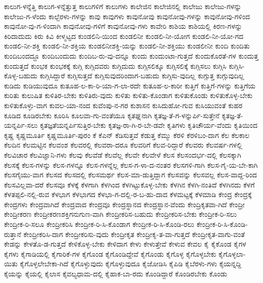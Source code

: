 {ಕಾಲುಗ-ಳನ್ನೆತ್ತಿ
ಕಾಲುಗ-ಳನ್ನೆತ್ತುತ್ತ
ಕಾಲುಗಳಿಗೆ
ಕಾಲುಗಳು
ಕಾಲೇಜಿನ
ಕಾಲೇಜಿನಲ್ಲಿ
ಕಾಲೇಜು
ಕಾಲೇಜು-ಗಳನ್ನು
ಕಾಲೇಜು-ಗ-ಳೆಂದು
ಕಾಲ್ಬೆರಳು-ಗಳನ್ನು
ಕಾವು
ಕಾವುಗಳು
ಕಾವುನೋವು
ಕಾವುನೋವು-ಗಳನ್ನು
ಕಾವುನೋವು-ಗಳಿಂದ
ಕಾವುನೋ-ವು-ಗ-ಳಿಂದಾಗಿ
ಕಾವುನೋವು-ಗಳಿಗೆ
ಕಾವುನೋವು-ಗಳು
ಕಾವೇರಿ
ಕಾಶಿಯ
ಕಾಶಿಯಲ್ಲಿ
ಕಿರಣ-ಗಳನ್ನು
ಕಿರಿದಾದುದು
ಕಿರು
ಕಿವಿ
ಕೀಳ್ಮಟ್ಟದ
ಕುಂಡಲಿನಿ-ಯಿಂದ
ಕುಂಡಲಿನೀ
ಕುಂಡಲಿ-ನೀ-ಯೋಗ
ಕುಂಡಲಿ-ನೀ-ಯೋ-ಗದ
ಕುಂಡಲಿ-ನೀ-ಶಕ್ತಿ
ಕುಂಡಲಿ-ನೀ-ಶಕ್ತಿಯ
ಕುಂಡಲಿನೀಶಕ್ತಿ-ಯನ್ನು
ಕುಂಡಲಿ-ನೀ-ಶಕ್ತಿಯು
ಕುಂಡಲೀನೀ
ಕುಂದಿ
ಕುಂದಿತು
ಕುಂದಿಬಂದದ್ದೂ
ಕುಂದಿಬಂದುದು
ಕುಂದಿಬ-ರು-ವು-ದನ್ನೂ
ಕುಂದು
ಕುಂದುಂಟಾ-ಗುತ್ತದೆ
ಕುಂದುಕೊರತೆ-ಗಳ
ಕುಂದುತ್ತ
ಕುಂದುತ್ತದೆ
ಕುಂಭಕ
ಕುಂಭಕಕ್ಕೆ
ಕುಗ್ಗಿ
ಕುಗ್ಗಿದವರು
ಕುಗ್ಗಿದುದು
ಕುಗ್ಗಿಸಲಿಕ್ಕೂ
ಕುಗ್ಗಿಸಲಿಕ್ಕೆ
ಕುಗ್ಗಿಸಲು
ಕುಗ್ಗಿಸಿ
ಕುಗ್ಗಿಸಿ-ಕೊಳ್ಳ-ಬಹುದು
ಕುಗ್ಗಿಸಿದ್ದಾರೆ
ಕುಗ್ಗಿಸುತ್ತದೆ
ಕುಗ್ಗಿಸುವುದರಿಂದಾಗ-ಬಹುದು
ಕುಗ್ಗಿಸು-ವುದಿಲ್ಲ
ಕುಗ್ಗುತ್ತ
ಕುಗ್ಗುವುದಿಲ್ಲ
ಕುಡಿದು
ಕುಡಿಯುವುದೂ
ಕುತೂಹ-ಲ-ಕಾ-ರಿ-ಯಾ-ಗ-ಲಾ-ರದೇ
ಕುತೂಹ-ಲ-ಕಾರೀ
ಕುತ್ತಿಗೆ
ಕುತ್ತಿಗೆ-ಗಳನ್ನು
ಕುತ್ತಿಗೆಯ
ಕುರಿತು
ಕುಲುಷಿತ
ಕುಳಿತಿರ-ಬೇಕು
ಕುಳಿತಿರು-ವುದು
ಕುಳಿತು
ಕುಳಿತು-ಕೊಂಡಾಗ
ಕುಳಿತುಕೊಂಡು
ಕುಳಿತುಕೊಳ್ಳ-ಬೇಕು
ಕುಳಿತುಕೊಳ್ಳು-ವಾಗ
ಕುವಲ-ಯಾ-ನಂದ
ಕುವೆಂಪು-ನ-ಗರ
ಕುಶಾಸನ
ಕುಸಿದುಹೋ-ಗುವ
ಕುಸಿಯುವಂತೆ
ಕುಹರ
ಕೂಡಿದ
ಕೂಡಿರಬೇಕು
ಕೂರಿಸಿ
ಕೂಲವಾ-ಗು-ವಂತೆಯೂ
ಕೃತಘ್ನನಾಗಿ
ಕೃತಜ್ಞ-ತೆ-ಗ-ಳನ್ನುರ್ಪಿ-ಸುತ್ತೇನೆ
ಕೃತಜ್ಞ-ತೆ-ಯನ್ನರ್ಪಿ-ಸಲು
ಕೃತಜ್ಞತೆಯನ್ನರ್ಪಿಸುತ್ತಿರ-ಬೇಕು
ಕೃತಜ್ಞ-ರಾ-ಗಿ-ರ-ಬೇ-ಡವೇ
ಕೃತಿಗಳು
ಕೃತಿಚೌರ್ಯ-ವೆಂದು
ಕೃತಿಯಿಂದ
ಕೃಷ್ಣ
ಕೃಷ್ಣಮೂರ್ತಿ
ಕೃಷ್ಣಮೂರ್ತಿ-ಪುರಂ
ಕೆ
ಕೆಎನ್
ಕೆಡಿಸುತ್ತವೆ
ಕೆಡುತ್ತ
ಕೆಮ್ಮು
ಕೆರಳಿ
ಕೆರಳಿಬಂ-ದಾಗ
ಕೆಲ
ಕೆಲಕಾಲ
ಕೆಲದಿನ
ಕೆಲಮಟ್ಟಿನ
ಕೆಲವಂಶ
ಕೆಲವರಲ್ಲಿ
ಕೆಲವರಾ-ದರೂ
ಕೆಲವರಿಗೆ
ಕೆಲವ-ರಿದ್ದಾರೆ
ಕೆಲವರು
ಕೆಲವರ್ಷ-ಗಳಲ್ಲಿ
ಕೆಲವಿಚಾರ
ಕೆಲವಿಜ್ಞಾನಿ-ಗಳು
ಕೆಲವು
ಕೆಲವೆಡೆ
ಕೆಲವೆಲ್ಲ
ಕೆಲವೇ
ಕೆಲವೇಳೆ
ಕೆಲಸ
ಕೆಲಸಂದರ್ಭ-ದಲ್ಲಿ
ಕೆಲಸಕ್ಕಾಗಿ
ಕೆಲಸಕ್ಕೆ
ಕೆಲಸ-ಗಳನ್ನು
ಕೆಲಸ-ಗಳನ್ನೂ
ಕೆಲಸ-ಗಳನ್ನೆಲ್ಲ
ಕೆಲಸ-ಗ-ಳಾ-ದ-ನಂತರ
ಕೆಲಸಗಳಿ-ಗಾಗಿ
ಕೆಲಸ-ಗೈ-ಯ-ಬೇ-ಕಾಗಿ
ಕೆಲಸಗೈಯು-ವಾಗ
ಕೆಲಸದ
ಕೆಲಸದಲ್ಲಿ
ಕೆಲಸಮರ್ಥ
ಕೆಲಸ-ಮಾ-ಡುತ್ತಿದ್ದಾಗ
ಕೆಲಸವನ್ನು
ಕೆಲಸವಲ್ಲ
ಕೆಲಸ-ವಾದ್ದ-ರಿಂದ
ಕೆಲಸವಿಲ್ಲವಾ-ದರೆ
ಕೆಲಸವೂ
ಕೆಳಕ್ಕೆ
ಕೆಳಗಾಗಿ
ಕೆಳಗಿಂದ
ಕೆಳಗಿಟ್ಟುಕೊಳ್ಳ-ಬೇಕು
ಕೆಳಗಿನ
ಕೆಳಗಿ-ನಂತಿದೆ
ಕೆಳಗಿನದು
ಕೆಳಗೆ
ಕೆಳತಪ್ಪಲಿ-ನಲ್ಲಿ-ರುವ
ಕೆಳಭಾಗ
ಕೆಳಭಾಗದ
ಕೆಳಭಾ-ಗ-ದಲ್ಲಿ-ರ-ಬ-ಹು-ದಾದ
ಕೆಳಮಟ್ಟಕ್ಕೆ
ಕೆಳಮಾಡಿ
ಕೇಂದ್ರ
ಕೇಂದ್ರಕ್ಕೆ
ಕೇಂದ್ರಗಳು
ಕೇಂದ್ರವಾಗಿದೆ
ಕೇಂದ್ರವಾದ
ಕೇಂದ್ರವೂ
ಕೇಂದ್ರಸ್ಥಾನದ
ಕೇಂದ್ರಸ್ಥಾನ-ವೆಂದು
ಕೇಂದ್ರಿಕೃತವಾ-ಗಿದೆ
ಕೇಂದ್ರೀ
ಕೇಂದ್ರೀಕರಣ
ಕೇಂದ್ರೀಕರಣಶಕ್ತಿಗನುಗುಣ-ವಾಗಿ
ಕೇಂದ್ರೀಕರಿಸ-ಬಹುದು
ಕೇಂದ್ರೀಕರಿಸ-ಬೇಕು
ಕೇಂದ್ರೀಕ-ರಿ-ಸಲು
ಕೇಂದ್ರೀಕ-ರಿ-ಸಲೂ
ಕೇಂದ್ರೀಕರಿಸಿ
ಕೇಂದ್ರೀಕ-ರಿ-ಸಿ-ಕೊಂಡಾಗ
ಕೇಂದ್ರೀಕ-ರಿ-ಸಿ-ಕೊಂಡಿ-ರಲು
ಕೇಂದ್ರೀಕ-ರಿ-ಸಿ-ಕೊಂಡಿ-ರುತ್ತಾನೆ
ಕೇಂದ್ರೀಕರಿಸಿ-ದಾಗ
ಕೇಂದ್ರೀಕರಿಸು-ವುದು
ಕೇಂದ್ರೀಕೃತ
ಕೇಂದ್ರೀಕೃ-ತ-ವಾ-ಗುತ್ತದೆ
ಕೇಂದ್ರೀಕೃತ-ವಾಗು-ವಂತೆ
ಕೇಡನ್ನು
ಕೇಳತೊ-ಡ-ಗುತ್ತದೆ
ಕೇಳಿಕೊಳ್ಳ-ಬೇಕು
ಕೇಳಿದಾಗ
ಕೇಳು
ಕೇಳುತ್ತೇವೆ
ಕೇಳುವ
ಕೇವಲ
ಕೈ
ಕೈಕೊಂಡ
ಕೈಗಳ
ಕೈಗಳು
ಕೈಗಾಡಿಯಲ್ಲಿ
ಕೈಗಾರಿಕೆ-ಗಳ
ಕೈಗೊಂಡ
ಕೈಗೊಂಡಿದ್ದೇವೆ
ಕೈಗೊಂಡು
ಕೈಗೊಳ್ಳ
ಕೈಗೊಳ್ಳಬೇಕು
ಕೈಗೊಳ್ಳಲಾ-ಯಿತು
ಕೈಗೊಳ್ಳಲೇಬೇಕಾ-ಗಿದೆ
ಕೈಗೊಳ್ಳುವುದು
ಕೈಗೊಳ್ಳುವುದೂ
ಕೈಜೋಡಿಸಿ
ಕೈಪಿಡಿ
ಕೈಬೆರಳು-ಗಳು
ಕೈಯನ್ನದ್ದಿ
ಕೈಯನ್ನು
ಕೈಯಲ್ಲಿ
ಕೈಲಾಸ
ಕೈವಲ್ಯಧಾಮ-ದಲ್ಲಿ
ಕೈಹಾಕ-ಬಾ-ರದು
ಕೊಂಡಿದ್ದಾರೆ
ಕೊಂಡಿರಬೇಕು
ಕೊಂಡು
}
